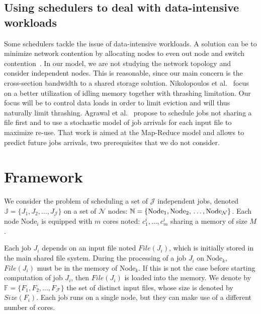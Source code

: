 \documentclass[conference]{IEEEtran}
\newcommand{\Node}[1]{\ensuremath{\mathrm{Node}_{#1}}\xspace}
\newcommand{\file}{\ensuremath{\mathit{File}}\xspace}
\newcommand{\size}{\ensuremath{\mathit{Size}}\xspace}
\newcommand{\memory}{\ensuremath{\mathit{M}}\xspace}
\newcommand{\fileset}{\ensuremath{\mathbb{F}}\xspace}
\newcommand{\filenum}{\ensuremath{\mathcal{F}}\xspace}
\newcommand{\jobset}{\ensuremath{\mathbb{J}}\xspace}
\newcommand{\jobnum}{\ensuremath{\mathcal{J}}\xspace}
\newcommand{\nodeset}{\ensuremath{\mathbb{N}}\xspace}
\newcommand{\nodenum}{\ensuremath{\mathcal{N}}\xspace}
\begin{document}
\subsection{Using schedulers to deal with data-intensive workloads}

Some schedulers tackle the issue of data-intensive workloads. 
A solution can be to minimize network contention by allocating nodes to even out node and
switch contention~\cite{minimize_network_contention}. 
In our model, we are not studying the network topology and consider independent nodes.
This is reasonable, since our main concern is the cross-section bandwidth to a shared storage solution.
%
Nikolopoulos et al.~\cite{Nikolopoulos2003AdaptiveSU}
focus on a better utilization of idling memory together with 
thrashing limitation.
Our focus will be to control data loads in order to limit eviction
and will thus naturally limit thrashing. 
%
Agrawal et al.~\cite{Scheduling_Shared_Scans_of_Large_Data_Files}
propose to schedule jobs not sharing a file first
and to use a stochastic model of job arrivals for each input file to maximize re-use.
That work is aimed at the Map-Reduce model and allows to predict future jobs arrivals, two prerequisites that we do not consider. 
%
%


\section{Framework}\label{sec.framework}

We consider the problem of scheduling a set of $\jobnum$ independent jobs,
denoted $\jobset = \{J_1, J_2, \ldots, J_\jobnum\}$ on a set of
$\nodenum$ nodes:
$\nodeset = \{\Node{1}, \Node{2}, \\ \ldots, \Node{\nodenum}\}$.
Each node $\Node{i}$ is equipped with $m$ cores noted:
$c^i_1,\ldots,c^i_m$ sharing a memory of size $\memory$.

Each job $J_i$ depends on an input file noted $\file(J_i)$, which is
initially stored in the main shared file system.  During the
processing of a job $J_i$ on $\Node{k}$, $\file(J_i)$ must be in
the memory of $\Node{k}$. If this is not the case before starting
computation of job $J_i$, then $\file(J_i)$ is loaded into the
memory.  We denote by $\fileset = \{F_1, F_2, \ldots, F_\filenum\}$ the set
of distinct input files, whose size is denoted by $\size(F_i)$. Each
job runs on a single node, but they can make use of a different number
of cores.
\end{document}
